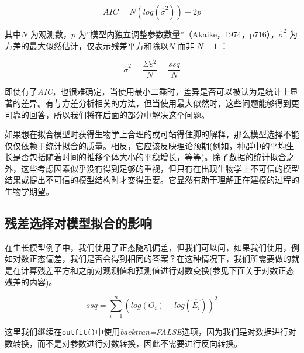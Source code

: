 \documentclass[
  lang=cn,
  11pt,
  scheme=chinese,
  chinesefont=nofont,
  citestyle=gb7714-2015,
  bibstyle=gb7714-2015]{elegantbook}
\begin{document}
\begin{equation}  
AIC=N \left(log\left(\hat\sigma^2 \right) \right)+2p  
\label{eq:eq48}  
\end{equation}

其中\(N\) 为观测数，\(p\) 为''模型内独立调整参数数量''（Akaike，1974，p716），\(\hat{\sigma}^2\) 为方差的最大似然估计，仅表示残差平方和除以\(N\) 而非 \(N-1\) ：

\begin{equation}  
\hat\sigma^2 = \frac{\Sigma\varepsilon^2}{N} = \frac{ssq}{N}  
\label{eq:eq49}  
\end{equation}

即使有了\emph{AIC}，也很难确定，当使用最小二乘时，差异是否可以被认为是统计上显著的差异。有与方差分析相关的方法，但当使用最大似然时，这些问题能够得到更可靠的回答，所以我们将在后面的部分中解决这个问题。

如果想在拟合模型时获得生物学上合理的或可站得住脚的解释，那么模型选择不能仅仅依赖于统计拟合的质量。相反，它应该反映理论预期(例如，种群中的平均生长是否包括随着时间的推移个体大小的平稳增长，等等)。除了数据的统计拟合之外，这些考虑因素似乎没有得到足够的重视，但只有在出现生物学上不可信的模型结果或提出不可信的模型结构时才变得重要。它显然有助于理解正在建模的过程的生物学期望。

\subsection{残差选择对模型拟合的影响}\label{ux6b8bux5deeux9009ux62e9ux5bf9ux6a21ux578bux62dfux5408ux7684ux5f71ux54cd}

在生长模型例子中，我们使用了正态随机偏差，但我们可以问，如果我们使用，例如对数正态偏差，我们是否会得到相同的答案？在这种情况下，我们所需要做的就是在计算残差平方和之前对观测值和预测值进行对数变换(参见下面关于对数正态残差的内容)。

\begin{equation}  
ssq=\sum\limits_{i=1}^{n}{{{\left( log({O_i})- log({\hat{E_i}}) \right)}^{2}}}  
\label{eq:eq410}  
\end{equation}

这里我们继续在\texttt{outfit()}中使用\emph{backtran=FALSE}选项，因为我们是对数据进行对数转换，而不是对参数进行对数转换，因此不需要进行反向转换。
\end{document}
